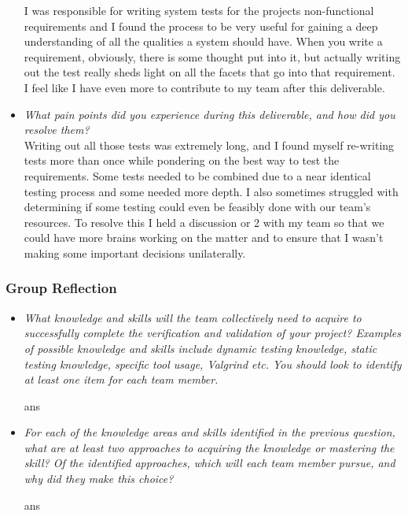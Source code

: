 \documentclass[12pt, titlepage]{article}
\begin{document}
\begin{appendices}
\begin{itemize}
  I was responsible for writing system tests for the projects non-functional requirements and I found the process to be very useful for gaining a deep understanding of all the qualities a system should have. When you write a requirement, obviously, there is some thought put into it, but actually writing out the test really sheds light on all the facets that go into that requirement. I feel like I have even more to contribute to my team after this deliverable.

  \item \textit{What pain points did you experience during this deliverable, and how did you resolve them?}\\
  
  Writing out all those tests was extremely long, and I found myself re-writing tests more than once while pondering on the best way to test the requirements. Some tests needed to be combined due to a near identical testing process and some needed more depth. I also sometimes struggled with determining if some testing could even be feasibly done with our team's resources. To resolve this I held a discussion or 2 with my team so that we could have more brains working on the matter and to ensure that I wasn't making some important decisions unilaterally.
\end{itemize}

\subsubsection*{Group Reflection}
\begin{itemize}
  \item \textit{What knowledge and skills will the team collectively need to acquire to
  successfully complete the verification and validation of your project?
  Examples of possible knowledge and skills include dynamic testing knowledge,
  static testing knowledge, specific tool usage, Valgrind etc.  You should look to
  identify at least one item for each team member.\\} 
  
  ans
  \item \textit{For each of the knowledge areas and skills identified in the previous
  question, what are at least two approaches to acquiring the knowledge or
  mastering the skill?  Of the identified approaches, which will each team
  member pursue, and why did they make this choice?\\} 
  
  ans

\end{itemize}

\end{appendices}
\end{document}
